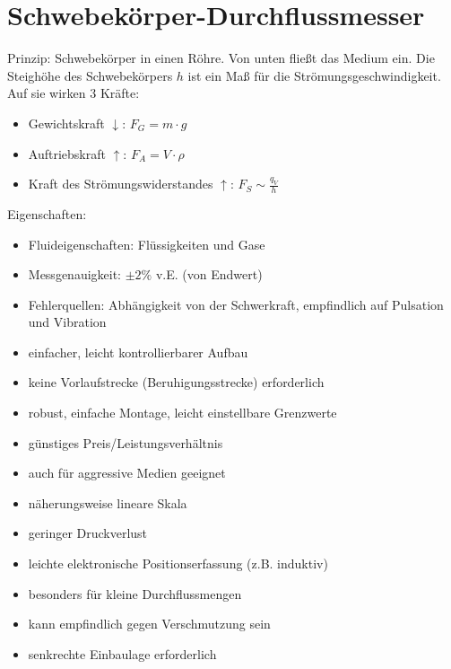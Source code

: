 \section{Schwebekörper-Durchflussmesser}
Prinzip: Schwebekörper in einen Röhre. Von unten fließt das Medium ein. Die Steighöhe des Schwebekörpers $h$ ist ein Maß für die Strömungsgeschwindigkeit. Auf sie wirken 3 Kräfte:
\begin{itemize}
\item Gewichtskraft $\downarrow$: $F_G=m\cdot g$
\item Auftriebskraft $\uparrow$: $F_A=V\cdot \rho$
\item Kraft des Strömungswiderstandes $\uparrow$: $F_S\sim \frac{q_V}{h}$
\end{itemize}
Eigenschaften:
\begin{itemize}
\item Fluideigenschaften: Flüssigkeiten und Gase
\item Messgenauigkeit: $\pm 2\%$ v.E. (von Endwert)
\item Fehlerquellen: Abhängigkeit von der Schwerkraft, empfindlich auf Pulsation und Vibration
\end{itemize}
\begin{itemize}[label=$+$]
\item einfacher, leicht kontrollierbarer Aufbau
\item keine Vorlaufstrecke (Beruhigungsstrecke) erforderlich
\item robust, einfache Montage, leicht einstellbare Grenzwerte
\item günstiges Preis/Leistungsverhältnis
\item auch für aggressive Medien geeignet
\item näherungsweise lineare Skala
\item geringer Druckverlust
\item leichte elektronische Positionserfassung (z.B. induktiv)
\item besonders für kleine Durchflussmengen
\end{itemize}
\begin{itemize}[label=$-$]
\item kann empfindlich gegen Verschmutzung sein
\item senkrechte Einbaulage erforderlich
\end{itemize}

